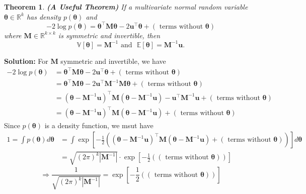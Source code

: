 \documentclass[13pt]{article}
\newtheorem{theorem}{Theorem}[section]
\theoremstyle{definition}
\newenvironment{solution}
{\color{C2}\begin{framed}\begingroup\textbf{Solution:} }
  {\endgroup\end{framed}}
\theoremstyle{remark}
\begin{document}
\begin{theorem}\label{theo:A Useful Theorem}
    \textbf{(A Useful Theorem)} If a multivariate normal random variable $\boldsymbol{\theta}\in \mathbb{R}^{k}$ has density $p(\boldsymbol{\theta})$ and 
    \[
    -2 \log p(\boldsymbol{\theta})=\boldsymbol{\theta}^{\top} \mathbf{M} \boldsymbol{\theta}-2 \boldsymbol{u}^{\top} \boldsymbol{\theta}+(\text{ terms without }\boldsymbol{\theta})
    \] 
    where $\mathbf{M}\in \mathbb{R}^{k\times k}$ is symmetric and invertible, then 
    \[
    \mathbb{V}[\boldsymbol{\theta}]=\mathbf{M}^{-1} \text{ and ~} \mathbb{E} [\boldsymbol{\theta}]=\mathbf{M}^{-1} \boldsymbol{u}.
    \]

\end{theorem}
\begin{solution}
    For $\mathbf{M}$ symmetric and invertible, we have
    \begin{align*}
    -2 \log p(\boldsymbol{\theta})&=\boldsymbol{\theta}^{\top} \mathbf{M} \boldsymbol{\theta}-2 \boldsymbol{u}^{\top} \boldsymbol{\theta}+(\text{ terms without }\boldsymbol{\theta})\\
    &=\boldsymbol{\theta}^{\top} \mathbf{M} \boldsymbol{\theta}-2 \boldsymbol{u}^{\top}\mathbf{M}^{-1}\mathbf{M} \boldsymbol{\theta}+(\text{ terms without }\boldsymbol{\theta})\\
    &=(\boldsymbol{\theta}-\mathbf{M}^{-1}\boldsymbol{u})^{\top} \mathbf{M}(\boldsymbol{\theta}-\mathbf{M}^{-1}\boldsymbol{u})-\bm{u}^{\top} \mathbf{M}^{-1} \boldsymbol{u}+(\text{ terms without }\boldsymbol{\theta})\\
    &=(\boldsymbol{\theta}-\mathbf{M}^{-1}\boldsymbol{u})^{\top} \mathbf{M}(\boldsymbol{\theta}-\mathbf{M}^{-1}\boldsymbol{u})+(\text{ terms without }\boldsymbol{\theta})
    \end{align*}
    Since $p(\boldsymbol{\theta})$ is a density function, we msut have
    \begin{align*}
    1=\int p(\boldsymbol{\theta}) d\bm{\theta} &= \int \exp\left[-\frac{1}{2}\left((\boldsymbol{\theta}-\mathbf{M}^{-1}\boldsymbol{u})^{\top} \mathbf{M}(\boldsymbol{\theta}-\mathbf{M}^{-1}\boldsymbol{u})+(\text{ terms without }\boldsymbol{\theta})\right)\right] d\bm{\theta}\\
    &=\sqrt{(2 \pi)^k|\mathbf{M}^{-1}|}\cdot \exp\left[-\frac{1}{2}\left((\text{ terms without }\boldsymbol{\theta})\right)\right]
    \end{align*}
    \[
    \Longrightarrow \frac{1}{\sqrt{(2 \pi)^k|\mathbf{M}^{-1}|}} = \exp\left[-\frac{1}{2}\left((\text{ terms without }\boldsymbol{\theta})\right)\right]
\]
\end{solution}
\end{document}
